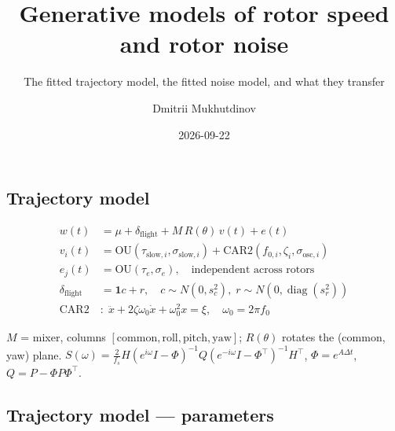 \documentclass[
  letterpaper,
  DIV=11,
  numbers=noendperiod]{scrartcl}
\title{Generative models of rotor speed and rotor noise}
\subtitle{The fitted trajectory model, the fitted noise model, and what
they transfer}
\author{Dmitrii Mukhutdinov}
\date{2026-09-22}
\begin{document}
\maketitle


\subsection{Trajectory model}\label{trajectory-model}

\[
\begin{aligned}
w(t) &= \mu + \delta_{\text{flight}} + M\,R(\theta)\,v(t) + e(t) \\
v_i(t) &= \mathrm{OU}(\tau_{\mathrm{slow},i}, \sigma_{\mathrm{slow},i}) + \mathrm{CAR2}(f_{0,i}, \zeta_i, \sigma_{\mathrm{osc},i}) \\
e_j(t) &= \mathrm{OU}(\tau_e, \sigma_e), \quad \text{independent across rotors} \\
\delta_{\text{flight}} &= \mathbf{1}c + r, \quad c \sim N(0, s_c^2),\; r \sim N(0, \operatorname{diag}(s_r^2)) \\
\mathrm{CAR2}&: \; \ddot{x} + 2\zeta\omega_0\dot{x} + \omega_0^2 x = \xi, \quad \omega_0 = 2\pi f_0
\end{aligned}
\]

\(M\) = mixer, columns
\([\text{common}, \text{roll}, \text{pitch}, \text{yaw}]\);
\(R(\theta)\) rotates the (common, yaw) plane.
\(S(\omega) = \tfrac{2}{f_s} H (e^{i\omega}I - \Phi)^{-1} Q (e^{-i\omega}I - \Phi^\top)^{-1} H^\top\),
\(\Phi = e^{A\Delta t}\), \(Q = P - \Phi P \Phi^\top\).

\subsection{Trajectory model ---
parameters}\label{trajectory-model-parameters}
\end{document}
